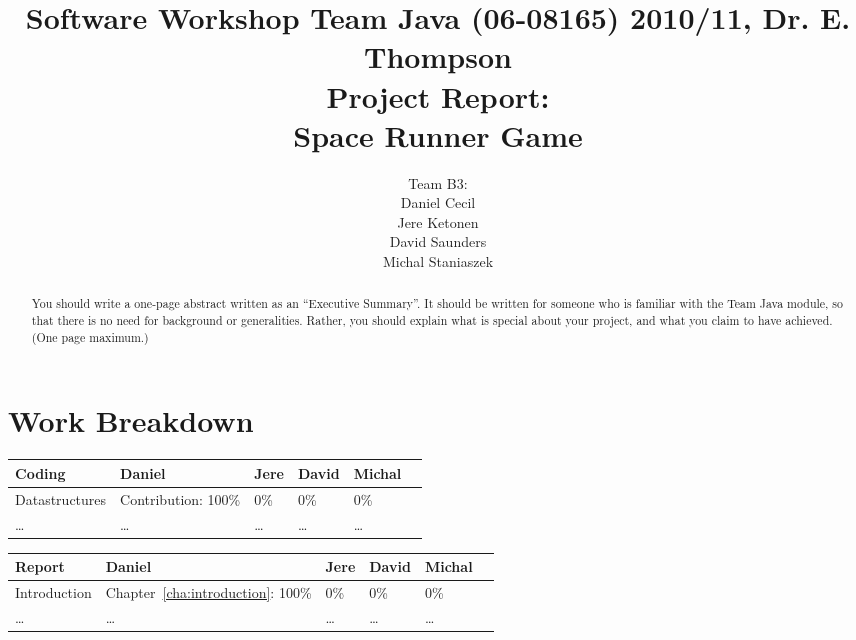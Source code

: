 \documentclass[10pt]{report}
\title{%
{\normalsize Software Workshop Team Java (06-08165) 2010/11, Dr. E. Thompson}\\[2cm]
Project Report:\\
Space Runner Game}
\author{Team B3:\\
Daniel Cecil\\
Jere Ketonen\\
David Saunders\\
Michal Staniaszek
}
\begin{document}
\maketitle
\chapter*{Work Breakdown}
\label{work-breakdown}

\thispagestyle{empty}

{\small

\noindent\begin{tabular}{|l||l|l|l|l|l|}\hline
  \textbf{Coding} & \textbf{Daniel} & \textbf{Jere} & \textbf{David}
 & \textbf{Michal} \\\hline\hline
 Datastructures & Contribution: 100\% & 0\% & 0\% & 0\%\\\hline
 \ldots & \ldots & \ldots & \ldots & \ldots \\\hline
\end{tabular}\vspace*{1cm}

\noindent\begin{tabular}{|l||l|l|l|l|l|}\hline
  \textbf{Report} & \textbf{Daniel} & \textbf{Jere} & \textbf{David}
 & \textbf{Michal}\\\hline\hline
 Introduction & Chapter~\ref{cha:introduction}: 100\% & 0\% & 0\% & 0\%\\\hline
 \ldots & \ldots & \ldots & \ldots & \ldots \\\hline
\end{tabular}

}     %

\tableofcontents
\thispagestyle{empty}

\begin{abstract}
  You should write a one-page abstract written as an ``Executive Summary''. It
  should be written for someone who is familiar with the Team Java module, so
  that there is no need for background or generalities. Rather, you should
  explain what is special about your project, and what you claim to have
  achieved. (One page maximum.)
\end{abstract}


\end{document}
